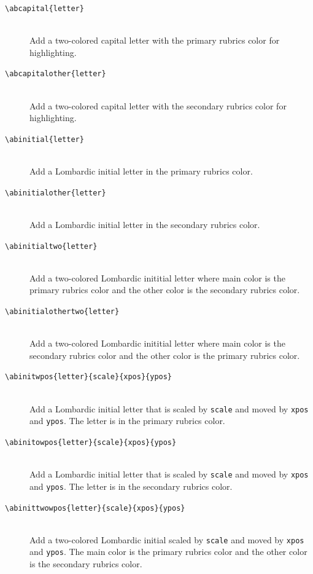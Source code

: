 \documentclass[a4paper]{article}
\newcommand{\feature}[1]{\texttt{#1}}
\newcommand{\ltxcmd}[2]{\texttt{\textbackslash{}#1\{#2\}}}
\newcommand{\ltxcmdfour}[5]{\texttt{\textbackslash{}#1\{#2\}\{#3\}\{#4\}\{#5\}}}
\begin{document}
\begin{description}

\item [\ltxcmd{abcapital}{letter}] \mbox{} \\
  Add a two-colored capital letter with the primary rubrics color for
  highlighting. 

\item [\ltxcmd{abcapitalother}{letter}] \mbox{} \\
  Add a two-colored capital letter with the secondary rubrics color for
  highlighting.
  
\item [\ltxcmd{abinitial}{letter}] \mbox{} \\
  Add a Lombardic initial letter in the primary rubrics color. 

\item [\ltxcmd{abinitialother}{letter}] \mbox{} \\
  Add a Lombardic initial letter in the secondary rubrics color. 

\item [\ltxcmd{abinitialtwo}{letter}] \mbox{} \\
  Add a two-colored Lombardic inititial letter where main color is the
  primary rubrics color and the other color is the secondary rubrics
  color. 

\item [\ltxcmd{abinitialothertwo}{letter}] \mbox{} \\
  Add a two-colored Lombardic inititial letter where main color is the
  secondary rubrics color and the other color is the primary rubrics
  color.

\item [\ltxcmdfour{abinitwpos}{letter}{scale}{xpos}{ypos}] \mbox{} \\
  Add a Lombardic initial letter that is scaled by \feature{scale} and
  moved by \feature{xpos} and \feature{ypos}. The letter is in the
  primary rubrics color. 

\item [\ltxcmdfour{abinitowpos}{letter}{scale}{xpos}{ypos}] \mbox{} \\
  Add a Lombardic initial letter that is scaled by \feature{scale} and
  moved by \feature{xpos} and \feature{ypos}. The letter is in the
  secondary rubrics color. 

\item [\ltxcmdfour{abinittwowpos}{letter}{scale}{xpos}{ypos}] \mbox{}   \\
  Add a two-colored Lombardic initial scaled by \feature{scale} and
  moved by \feature{xpos} and \feature{ypos}. The main color is the
  primary rubrics color and the other color is the secondary rubrics
  color. 


\end{description}
\end{document}
